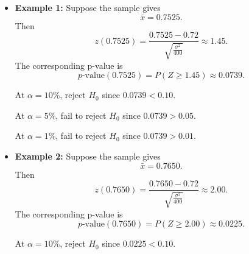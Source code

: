 \begin{itemize}
	\item \textbf{Example 1:} Suppose the sample gives
	\[
	\bar x=0.7525.
	\]
	Then
	\[
	z(0.7525)=\frac{0.7525-0.72}{\sqrt{\frac{\sigma^2}{400}}}
	\approx 1.45.
	\]
	The corresponding p-value is
	\[
	p\text{-value}(0.7525)=P(Z\ge1.45)\approx 0.0739.
	\]
	
	At \(\alpha=10\%\), reject \(H_0\) since \(0.0739<0.10\).
	
	\begin{center}
	\end{center}
	
	
	At \(\alpha=5\%\), fail to reject \(H_0\) since \(0.0739>0.05\).
	
	\begin{center}
	\end{center}
	
	
	At \(\alpha=1\%\), fail to reject \(H_0\) since \(0.0739>0.01\).
	
	\begin{center}
	\end{center}
	
	
	\item \textbf{Example 2:} Suppose the sample gives
	\[
	\bar x=0.7650.
	\]
	Then
	\[
	z(0.7650)=\frac{0.7650-0.72}{\sqrt{\frac{\sigma^2}{400}}}
	\approx 2.00.
	\]
	The corresponding p-value is
	\[
	p\text{-value}(0.7650)=P(Z\ge2.00)\approx 0.0225.
	\]
	
	At \(\alpha=10\%\), reject \(H_0\) since \(0.0225<0.10\).
	
	\begin{center}
	\end{center}
	
	

\end{itemize}
